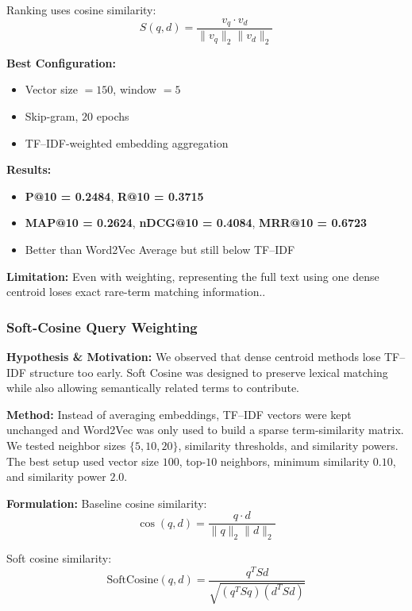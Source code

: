 \documentclass[runningheads]{llncs}
\begin{document}
Ranking uses cosine similarity:
\begin{equation}
S(q,d) = \frac{v_q \cdot v_d}{\|v_q\|_2 \|v_d\|_2}
\end{equation}

\textbf{Best Configuration:}
\begin{itemize}[noitemsep]
    \item Vector size $=150$, window $=5$
    \item Skip-gram, $20$ epochs
    \item TF--IDF-weighted embedding aggregation
\end{itemize}

\textbf{Results:}
\begin{itemize}[noitemsep]
    \item \textbf{P@10 = 0.2484}, \textbf{R@10 = 0.3715}
    \item \textbf{MAP@10 = 0.2624}, \textbf{nDCG@10 = 0.4084}, \textbf{MRR@10 = 0.6723}
    \item Better than Word2Vec Average but still below TF--IDF
\end{itemize}

\textbf{Limitation:}  
Even with weighting, representing the full text using one dense centroid loses exact rare-term matching information..

\subsubsection{Soft-Cosine Query Weighting}

\textbf{Hypothesis \& Motivation:}  
We observed that dense centroid methods lose TF--IDF structure too early. Soft Cosine was designed to preserve lexical matching while also allowing semantically related terms to contribute.

\textbf{Method:}  
Instead of averaging embeddings, TF--IDF vectors were kept unchanged and Word2Vec was only used to build a sparse term-similarity matrix. We tested neighbor sizes $\{5,10,20\}$, similarity thresholds, and similarity powers. The best setup used vector size $100$, top-$10$ neighbors, minimum similarity $0.10$, and similarity power $2.0$.

\textbf{Formulation:}  
Baseline cosine similarity:
\begin{equation}
\cos(q,d) = \frac{q \cdot d}{\|q\|_2 \|d\|_2}
\end{equation}

Soft cosine similarity:
\begin{equation}
\text{SoftCosine}(q, d) = \frac{q^T S d}{\sqrt{(q^T S q)(d^T S d)}}
\end{equation}
\end{document}

